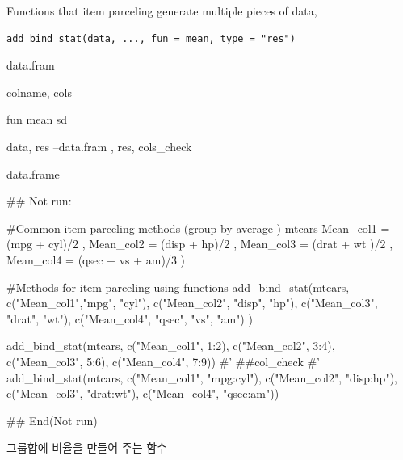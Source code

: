 \documentclass[a4paper]{book}
\begin{document}
%
\begin{Description}
Functions that item parceling generate multiple pieces of data,
\end{Description}
%
\begin{Usage}
\begin{verbatim}
add_bind_stat(data, ..., fun = mean, type = "res")
\end{verbatim}
\end{Usage}
%
\begin{Arguments}
\begin{ldescription}
\item[\code{data}] data.fram

\item[\code{...}] colname, cols

\item[\code{fun}] fun  mean sd

\item[\code{type}] data, res --data.fram , res, cols\_check
\end{ldescription}
\end{Arguments}
%
\begin{Value}
data.frame
\end{Value}
%
\begin{Examples}
\begin{ExampleCode}
## Not run: 

#Common item parceling methods (group by average )
mtcars %
Mean_col1 = (mpg + cyl)/2 ,
Mean_col2 = (disp + hp)/2 ,
Mean_col3 = (drat + wt )/2 ,
Mean_col4 = (qsec + vs + am)/3 )

#Methods for item parceling using functions
add_bind_stat(mtcars,
c("Mean_col1","mpg", "cyl"),
c("Mean_col2", "disp", "hp"),
c("Mean_col3", "drat", "wt"),
c("Mean_col4", "qsec", "vs", "am") )



add_bind_stat(mtcars,
   c("Mean_col1", 1:2),
   c("Mean_col2", 3:4),
   c("Mean_col3", 5:6),
   c("Mean_col4", 7:9))
#'  ##col_check
#'
add_bind_stat(mtcars,
              c("Mean_col1", "mpg:cyl"),
              c("Mean_col2", "disp:hp"),
              c("Mean_col3", "drat:wt"),
              c("Mean_col4", "qsec:am"))

## End(Not run)

\end{ExampleCode}
\end{Examples}
%
\begin{Description}
그룹합에 비율을 만들어 주는 함수
\end{Description}
\end{document}

